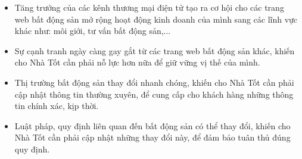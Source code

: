 \begin{tcbraster}[raster columns=2, boxrule=0mm, arc=0mm]
\begin{tcolorbox}[equal height group=B, size=fbox, colback=swotO!60, colframe=swotO!80!black, title=\textsc{opportunities}]
\begin{itemize}
\item Tăng trưởng của các kênh thương mại điện tử tạo ra cơ hội cho các trang web bất động sản mở rộng hoạt động kinh doanh của mình sang các lĩnh vực khác như: môi giới, tư vấn bất động sản,...
\end{itemize}
\end{tcolorbox}
\begin{tcolorbox}[equal height group=B, size=fbox, colback=swotT!60, colframe=swotT!80!black, title=\textsc{threats}]
\begin{itemize}
\item Sự cạnh tranh ngày càng gay gắt từ các trang web bất động sản khác, khiến cho Nhà Tốt cần phải nỗ lực hơn nữa để giữ vững vị thế của mình.
\item Thị trường bất động sản thay đổi nhanh chóng, khiến cho Nhà Tốt cần phải cập nhật thông tin thường xuyên, để cung cấp cho khách hàng những thông tin chính xác, kịp thời.
\item Luật pháp, quy định liên quan đến bất động sản có thể thay đổi, khiến cho Nhà Tốt cần phải cập nhật những thay đổi này, để đảm bảo tuân thủ đúng quy định.
\end{itemize}
\end{tcolorbox}
\end{tcbraster}
